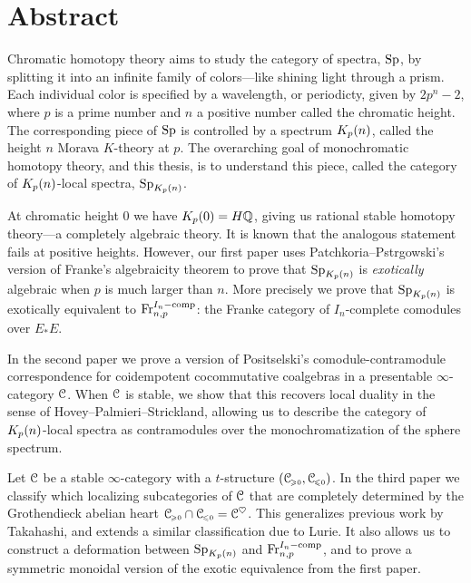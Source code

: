 

\section*{Abstract}

Chromatic homotopy theory aims to study the category of spectra, $\mathrm{Sp}$, by splitting it into an infinite family of colors---like shining light through a prism. Each individual color is specified by a wavelength, or periodicty, given by $2p^n-2$, where $p$ is a prime number and $n$ a positive number called the chromatic height. The corresponding piece of $\mathrm{Sp}$ is controlled by a spectrum ${K_p(n)}$, called the height $n$ Morava $K$-theory at $p$. The overarching goal of monochromatic homotopy theory, and this thesis, is to understand this piece, called the category of ${K_p(n)}$-local spectra, $\mathrm{Sp}_{K_p(n)}$. 

At chromatic height $0$ we have $K_p(0) = H\mathbb{Q}$, giving us rational stable homotopy theory---a completely algebraic theory. It is known that the analogous statement fails at positive heights. However, our first paper uses Patchkoria--Pstr\a{}gowski's version of Franke's algebraicity theorem to prove that $\mathrm{Sp}_{K_p(n)}$ is \emph{exotically} algebraic when $p$ is much larger than $n$. More precisely we prove that $\mathrm{Sp}_{K_p(n)}$ is exotically equivalent to $\mathrm{Fr}_{n,p}^{I_n-\mathrm{comp}}$: the Franke category of $I_n$-complete comodules over $E_*E$. 

In the second paper we prove a version of Positselski's comodule-contramodule correspondence for coidempotent cocommutative coalgebras in a presentable $\infty$-category $\EuScript{C}$. When $\EuScript{C}$ is stable, we show that this recovers local duality in the sense of Hovey--Palmieri--Strickland, allowing us to describe the category of ${K_p(n)}$-local spectra as contramodules over the monochromatization of the sphere spectrum. 

Let $\EuScript{C}$ be a stable $\infty$-category with a $t$-structure $(\EuScript{C}_{\hspace{-1pt}\scriptscriptstyle\geqslant 0}, \EuScript{C}_{\hspace{-1pt}\scriptscriptstyle\leqslant 0})$. In the third paper we classify which localizing subcategories of $\EuScript{C}$ that are completely determined by the Grothendieck abelian heart $\EuScript{C}_{\hspace{-1pt}\scriptscriptstyle\geqslant 0} \cap \EuScript{C}_{\hspace{-1pt}\scriptscriptstyle\leqslant 0} = \EuScript{C}^\heartsuit$. This generalizes previous work by Takahashi, and extends a similar classification due to Lurie. It also allows us to construct a deformation between $\mathrm{Sp}_{K_p(n)}$ and $\mathrm{Fr}_{n,p}^{I_n-\mathrm{comp}}$, and to prove a symmetric monoidal version of the exotic equivalence from the first paper. 





